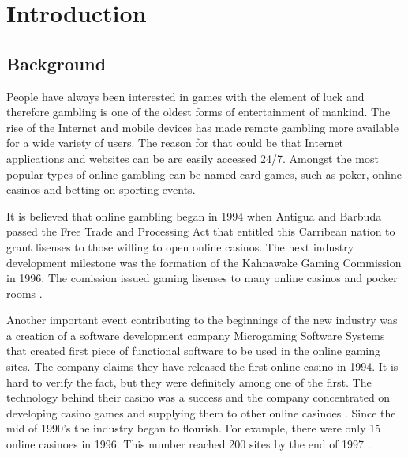 \chapter{Introduction}
\label{sec:introduction}
\setcounter{page}{1}

\section{Background}
\label{sec:background_intro}
People have always been interested in games with the element of luck and therefore gambling is one of the oldest forms of entertainment of mankind. The rise of the Internet and mobile devices has made remote gambling more available for a wide variety of users. The reason for that could be that Internet applications and websites can be are easily accessed 24/7. Amongst the most popular types of online gambling can be named card games, such as poker, online casinos and betting on sporting events.

It is believed that online gambling began in 1994 when Antigua and Barbuda passed the Free Trade and Processing Act that entitled this Carribean nation to grant lisenses to those willing to open online casinos. The next industry development milestone was the formation of the Kahnawake Gaming Commission in 1996. The comission issued gaming lisenses to many online casinos and pocker rooms \citep{art:historyofonlinegambling}. 

Another important event contributing to the beginnings of the new industry was a creation of a software development company Microgaming Software Systems that created first piece of functional software to be used in the online gaming sites. The company claims they have released the first online casino in 1994. It is hard to verify the fact, but they were definitely among one of the first. The technology behind their casino was a success and the company concentrated on developing casino games and supplying them to other online casinoes \citep{source:microgaming} \citep{source:gamblingsites}. Since the mid of 1990's the industry began to flourish. For example, there were only 15 online casinoes in 1996. This number reached 200 sites by the end of 1997 \citep{art:historyofonlinegambling}.   

